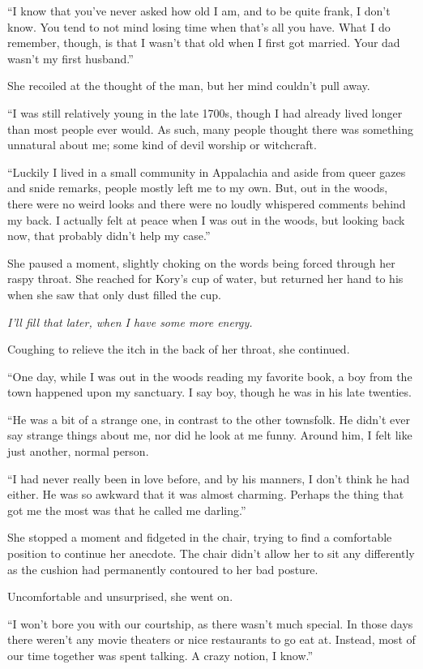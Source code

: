``I know that you've never asked how old I am, and to be quite frank, I don't know. You tend to not mind losing time when that's all you have. What I do remember, though, is that I wasn't that old when I first got married. Your dad wasn't my first husband.''

She recoiled at the thought of the man, but her mind couldn't pull away.

``I was still relatively young in the late 1700s, though I had already lived longer than most people ever would. As such, many people thought there was something unnatural about me; some kind of devil worship or witchcraft.

``Luckily I lived in a small community in Appalachia and  aside from queer gazes and snide remarks, people mostly left me to my own. But, out in the woods, there were no weird looks and there were no loudly whispered comments behind my back. I actually felt at peace when I was out in the woods, but looking back now, that probably didn't help my case.''

She paused a moment, slightly choking on the words being forced through her raspy throat. She reached for Kory's cup of water, but returned her hand to his when she saw that only dust filled the cup.

\textit{I'll fill that later, when I have some more energy.}

Coughing to relieve the itch in the back of her throat, she continued.

``One day, while I was out in the woods reading my favorite book, a boy from the town happened upon my sanctuary. I say boy, though he was in his late twenties.

``He was a bit of a strange one, in contrast to the other townsfolk. He didn't ever say strange things about me, nor did he look at me funny. Around him, I felt like just another, normal person.

``I had never really been in love before, and by his manners, I don't think he had either. He was so awkward that it was almost charming. Perhaps the thing that got me the most was that he called me darling.''

She stopped a moment and fidgeted in the chair, trying to find a comfortable position to continue her anecdote. The chair didn't allow her to sit any differently as the cushion had permanently contoured to her bad posture.

Uncomfortable and unsurprised, she went on.

``I won't bore you with our courtship, as there wasn't much special. In those days there weren't any movie theaters or nice restaurants to go eat at. Instead, most of our time together was spent talking. A crazy notion, I know.''

